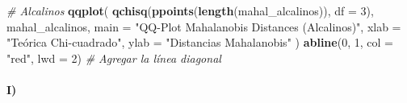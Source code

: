 \documentclass[
]{article}
\newenvironment{Shaded}{\begin{snugshade}}{\end{snugshade}}
\newcommand{\AttributeTok}[1]{\textcolor[rgb]{0.13,0.29,0.53}{#1}}
\newcommand{\CommentTok}[1]{\textcolor[rgb]{0.56,0.35,0.01}{\textit{#1}}}
\newcommand{\DecValTok}[1]{\textcolor[rgb]{0.00,0.00,0.81}{#1}}
\newcommand{\FunctionTok}[1]{\textcolor[rgb]{0.13,0.29,0.53}{\textbf{#1}}}
\newcommand{\NormalTok}[1]{#1}
\newcommand{\OtherTok}[1]{\textcolor[rgb]{0.56,0.35,0.01}{#1}}
\newcommand{\SpecialCharTok}[1]{\textcolor[rgb]{0.81,0.36,0.00}{\textbf{#1}}}
\newcommand{\StringTok}[1]{\textcolor[rgb]{0.31,0.60,0.02}{#1}}
\begin{document}
\begin{Shaded}
\begin{Highlighting}[]
\CommentTok{\# Alcalinos}
\FunctionTok{qqplot}\NormalTok{(}
  \FunctionTok{qchisq}\NormalTok{(}\FunctionTok{ppoints}\NormalTok{(}\FunctionTok{length}\NormalTok{(mahal\_alcalinos)), }\AttributeTok{df =} \DecValTok{3}\NormalTok{), mahal\_alcalinos,}
  \AttributeTok{main =} \StringTok{"QQ{-}Plot Mahalanobis Distances (Alcalinos)"}\NormalTok{,}
  \AttributeTok{xlab =} \StringTok{"Teórica Chi{-}cuadrado"}\NormalTok{,}
  \AttributeTok{ylab =} \StringTok{"Distancias Mahalanobis"}
\NormalTok{)}
\FunctionTok{abline}\NormalTok{(}\DecValTok{0}\NormalTok{, }\DecValTok{1}\NormalTok{, }\AttributeTok{col =} \StringTok{"red"}\NormalTok{, }\AttributeTok{lwd =} \DecValTok{2}\NormalTok{)  }\CommentTok{\# Agregar la línea diagonal}
\end{Highlighting}
\end{Shaded}

\hypertarget{i-1}{%
\paragraph{I)}\label{i-1}}

\begin{Shaded}
\end{Shaded}
\end{document}
